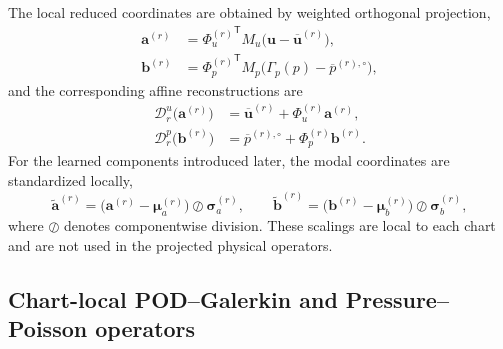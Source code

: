 The local reduced coordinates are obtained by weighted orthogonal projection,
\begin{align}
  \boldsymbol{a}^{(r)}
  &=
  {\Phi_u^{(r)}}^{\mathsf T}M_u
  \bigl(\boldsymbol{u}-\overline{\boldsymbol{u}}^{(r)}\bigr),
  \label{eq:velocity_encode}\\
  \boldsymbol{b}^{(r)}
  &=
  {\Phi_p^{(r)}}^{\mathsf T}M_p
  \bigl(\Gamma_p(p)-\overline{p}^{(r),\circ}\bigr),
  \label{eq:pressure_encode}
\end{align}
and the corresponding affine reconstructions are
\begin{align}
  \mathcal{D}^{u}_{r}\bigl(\boldsymbol{a}^{(r)}\bigr)
  &=
  \overline{\boldsymbol{u}}^{(r)}
  +\Phi_u^{(r)}\boldsymbol{a}^{(r)},
  \label{eq:velocity_decode}\\
  \mathcal{D}^{p}_{r}\bigl(\boldsymbol{b}^{(r)}\bigr)
  &=
  \overline{p}^{(r),\circ}
  +\Phi_p^{(r)}\boldsymbol{b}^{(r)}.
  \label{eq:pressure_decode}
\end{align}
For the learned components introduced later, the modal coordinates are
standardized locally,
\begin{equation}
  \widetilde{\boldsymbol{a}}^{(r)}
  =
  \bigl(\boldsymbol{a}^{(r)}-\boldsymbol{\mu}_{a}^{(r)}\bigr)
  \oslash\boldsymbol{\sigma}_{a}^{(r)},
  \qquad
  \widetilde{\boldsymbol{b}}^{(r)}
  =
  \bigl(\boldsymbol{b}^{(r)}-\boldsymbol{\mu}_{b}^{(r)}\bigr)
  \oslash\boldsymbol{\sigma}_{b}^{(r)},
  \label{eq:local_scalers}
\end{equation}
where $\oslash$ denotes componentwise division.  These scalings are local to
each chart and are not used in the projected physical operators.

\subsection{Chart-local POD--Galerkin and Pressure--Poisson operators}
\label{subsec:local_galerkin_pressure_poisson}

